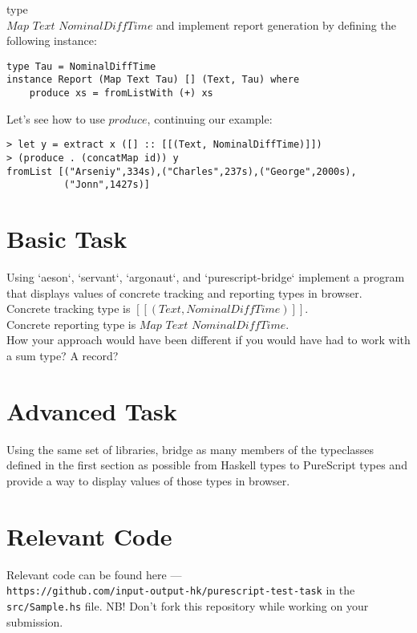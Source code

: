 \documentclass{article}
\begin{document}
type \\$ Map $ $ Text $ $ NominalDiffTime $ and implement report generation by defining the
following instance:
\begin{verbatim}
type Tau = NominalDiffTime
instance Report (Map Text Tau) [] (Text, Tau) where
    produce xs = fromListWith (+) xs
\end{verbatim}
Let's see how to use $ produce $, continuing our example:
\begin{verbatim}
> let y = extract x ([] :: [[(Text, NominalDiffTime)]])
> (produce . (concatMap id)) y
fromList [("Arseniy",334s),("Charles",237s),("George",2000s),
          ("Jonn",1427s)]
\end{verbatim}

\section{Basic Task}

Using `aeson`, `servant`, `argonaut`, and `purescript-bridge` implement a program that
displays values of concrete tracking and reporting types in browser.
\\
Concrete tracking type is $ [[(Text, NominalDiffTime)]] $.
\\
Concrete reporting type is $ Map $ $ Text $ $ NominalDiffTime $.
\\
How your approach would have been different if you would have had to work with a sum type? A record?

\section{Advanced Task}

Using the same set of libraries, bridge as many members of the typeclasses
defined in the first section as possible from Haskell types to PureScript types
and provide a way to display values of those types in browser.

\section{Relevant Code}
Relevant code  can be found here —\\
\texttt{https://github.com/input-output-hk/purescript-test-task} in the \\\texttt{src/Sample.hs} file.
NB! Don't fork this repository while working on your submission.
\end{document}
